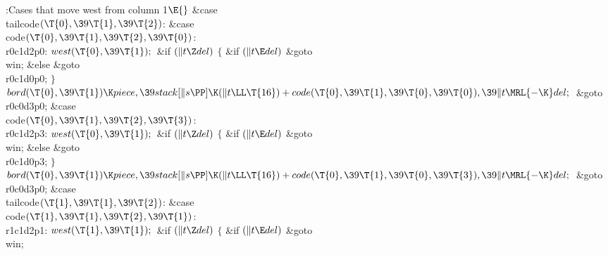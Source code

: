 \B{}:Cases that move west from column 1\X${}\E{}$\6
\4\&{case} \\{tailcode}${}(\T{0},\39\T{1},\39\T{2}){}$:\5
\&{case} \\{code}${}(\T{0},\39\T{1},\39\T{2},\39\T{0}){}$:\5
\\{r0c1d2p0}:\5
${}\\{west}(\T{0},\39\T{1});{}$\6
\&{if} ${}(\|t\Z\\{del}){}$\5
${}\{{}$\5
\1\&{if} ${}(\|t\E\\{del}){}$\1\5
\&{goto} \\{win};\5
\2\&{else}\1\5
\&{goto} \\{r0c1d0p0};\5
\2${}\}{}$\2\6
${}\\{bord}(\T{0},\39\T{1})\K\\{piece},\39\\{stack}[\|s\PP]\K(\|t\LL\T{16})+%
\\{code}(\T{0},\39\T{1},\39\T{0},\39\T{0}),\39\|t\MRL{-{\K}}\\{del};{}$\6
\&{goto} \\{r0c0d3p0};\6
\4\&{case} \\{code}${}(\T{0},\39\T{1},\39\T{2},\39\T{3}){}$:\5
\\{r0c1d2p3}:\5
${}\\{west}(\T{0},\39\T{1});{}$\6
\&{if} ${}(\|t\Z\\{del}){}$\5
${}\{{}$\5
\1\&{if} ${}(\|t\E\\{del}){}$\1\5
\&{goto} \\{win};\5
\2\&{else}\1\5
\&{goto} \\{r0c1d0p3};\5
\2${}\}{}$\2\6
${}\\{bord}(\T{0},\39\T{1})\K\\{piece},\39\\{stack}[\|s\PP]\K(\|t\LL\T{16})+%
\\{code}(\T{0},\39\T{1},\39\T{0},\39\T{3}),\39\|t\MRL{-{\K}}\\{del};{}$\6
\&{goto} \\{r0c0d3p0};\6
\4\&{case} \\{tailcode}${}(\T{1},\39\T{1},\39\T{2}){}$:\5
\&{case} \\{code}${}(\T{1},\39\T{1},\39\T{2},\39\T{1}){}$:\5
\\{r1c1d2p1}:\5
${}\\{west}(\T{1},\39\T{1});{}$\6
\&{if} ${}(\|t\Z\\{del}){}$\5
${}\{{}$\5
\1\&{if} ${}(\|t\E\\{del}){}$\1\5
\&{goto} \\{win};\5
